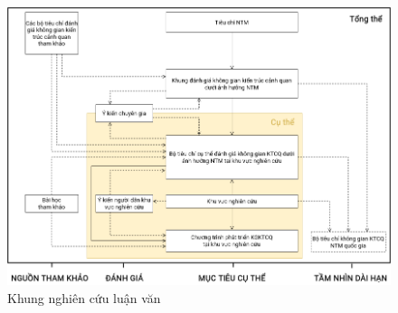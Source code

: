 \documentclass[../thesis.tex]{subfiles}
\begin{document}
\begin{landscape}
\begin{figure}[ht!]
\caption{Khung nghiên cứu luận văn}
\includegraphics[width=21cm]{Graphic/index.png}
\end{figure}
\end{landscape}
\end{document}
